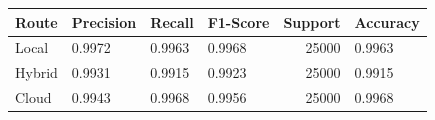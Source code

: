 \begin{tabular}{llllrl}
\toprule
Route & Precision & Recall & F1-Score & Support & Accuracy \\
\midrule
Local & 0.9972 & 0.9963 & 0.9968 & 25000 & 0.9963 \\
Hybrid & 0.9931 & 0.9915 & 0.9923 & 25000 & 0.9915 \\
Cloud & 0.9943 & 0.9968 & 0.9956 & 25000 & 0.9968 \\
\bottomrule
\end{tabular}
